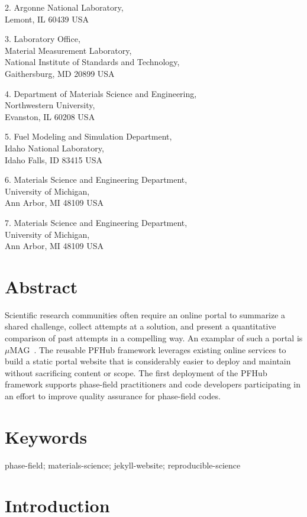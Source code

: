 \documentclass{jors}
\begin{document}
2. Argonne National Laboratory, \\
Lemont, IL 60439 USA

3. Laboratory Office, \\
Material Measurement Laboratory, \\
National Institute of Standards and Technology, \\
Gaithersburg, MD 20899 USA

4. Department of Materials Science and Engineering, \\
Northwestern University, \\
Evanston, IL 60208 USA

5. Fuel Modeling and Simulation Department, \\
Idaho National Laboratory, \\
Idaho Falls, ID 83415 USA

6. Materials Science and Engineering Department, \\
University of Michigan, \\
Ann Arbor, MI 48109 USA

7. Materials Science and Engineering Department, \\
University of Michigan, \\
Ann Arbor, MI 48109 USA

\section*{Abstract}

Scientific research communities often require an online portal to
summarize a shared challenge, collect attempts at a solution, and
present a quantitative comparison of past attempts in a compelling
way. An examplar of such a portal is $\mu$MAG~\cite{mumag}. The
reusable PFHub framework leverages existing online services to build a
static portal website that is considerably easier to deploy and
maintain without sacrificing content or scope. The first deployment of
the PFHub framework supports phase-field practitioners and code
developers participating in an effort to improve quality assurance for
phase-field codes.

\section*{Keywords}

phase-field; materials-science; jekyll-website; reproducible-science

\section*{Introduction}
\end{document}
